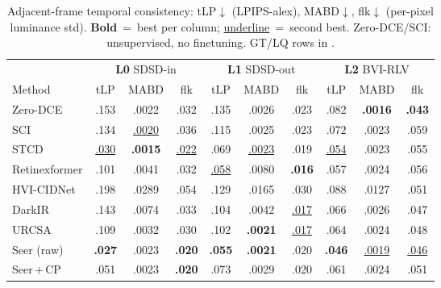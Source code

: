 \begin{table}[!htbp]
\centering\scriptsize\setlength{\tabcolsep}{1.8pt}
\renewcommand{\arraystretch}{0.82}
\begin{tabular}{l ccc ccc ccc}
\toprule
& \multicolumn{3}{c}{\textbf{L0} SDSD-in} & \multicolumn{3}{c}{\textbf{L1} SDSD-out} & \multicolumn{3}{c}{\textbf{L2} BVI-RLV} \\
\cmidrule(lr){2-4}\cmidrule(lr){5-7}\cmidrule(lr){8-10}
Method & tLP & MABD & flk & tLP & MABD & flk & tLP & MABD & flk \\
\midrule
Zero-DCE      & .153 & .0022 & .032 & .135 & .0026 & .023 & .082 & \textbf{.0016} & \textbf{.043} \\
SCI           & .134 & \underline{.0020} & .036 & .115 & .0025 & .023 & .072 & .0023 & .059 \\
STCD          & \underline{.030} & \textbf{.0015} & \underline{.022} & .069 & \underline{.0023} & .019 & \underline{.054} & .0023 & .055 \\
Retinexformer & .101 & .0041 & .032 & \underline{.058} & .0080 & \textbf{.016} & .057 & .0024 & .056 \\
HVI-CIDNet    & .198 & .0289 & .054 & .129 & .0165 & .030 & .088 & .0127 & .051 \\
DarkIR        & .143 & .0074 & .033 & .104 & .0042 & \underline{.017} & .066 & .0026 & .047 \\
URCSA         & .109 & .0032 & .030 & .102 & \textbf{.0021} & \underline{.017} & .064 & .0024 & .048 \\
\midrule
\rowcolor{gray!8}
Seer (raw)    & \textbf{.027} & .0023 & \textbf{.020} & \textbf{.055} & \textbf{.0021} & .020 & \textbf{.046} & \underline{.0019} & \underline{.046} \\
\rowcolor{gray!8}
Seer\,+\,CP   & .051 & .0023 & \textbf{.020} & .073 & .0029 & .020 & .061 & .0024 & .051 \\
\bottomrule
\end{tabular}
\caption{Adjacent-frame temporal consistency: tLP$\downarrow$ (LPIPS-alex), MABD$\downarrow$, flk$\downarrow$ (per-pixel luminance std). \textbf{Bold}~=~best per column; \underline{underline}~=~second best. Zero-DCE/SCI: unsupervised, no finetuning. GT/LQ rows in .}
\label{tab:temporal_main}
\end{table}

